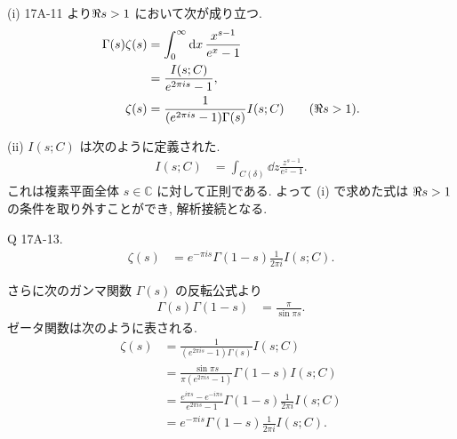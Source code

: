 \documentclass[uplatex,dvipdfmx,a4paper,11pt]{jlreq}
\theoremstyle{definition}
\newcommand{\CC}{\mathbb{C}}
\begin{document}
(i) 17A-11 より$\real s > 1$ において次が成り立つ.
\begin{align}
  \Gamma(s)\zeta(s) & = \int_0^\infty\dd{x}\frac{x^{s-1}}{e^x - 1}                        \\
                    & = \frac{I(s; C)}{e^{2\pi is} - 1},                                  \\
  \zeta(s)          & = \frac{1}{(e^{2\pi is} - 1)\Gamma(s)}I(s; C) \qquad (\real s > 1).
\end{align}

(ii)
$I(s; C)$ は次のように定義された.
\begin{align}
  I(s; C) & = \int_{C(\delta)}\dd{z}\frac{z^{s-1}}{e^z - 1}.
\end{align}
これは複素平面全体 $s\in\CC$ に対して正則である. よって (i) で求めた式は $\real s > 1$ の条件を取り外すことができ, 解析接続となる.

\begin{itembox}[l]{Q 17A-13.}
  \begin{align}
    \zeta(s) & = e^{-\pi is}\Gamma(1 - s)\frac{1}{2\pi i}I(s; C).
  \end{align}
\end{itembox}

さらに次のガンマ関数 $\Gamma(s)$ の反転公式より
\begin{align}
  \Gamma(s)\Gamma(1-s) & = \frac{\pi}{\sin\pi s}.
\end{align}
ゼータ関数は次のように表される.
\begin{align}
  \zeta(s) & = \frac{1}{(e^{2\pi is} - 1)\Gamma(s)}I(s; C)                                          \\
           & = \frac{\sin\pi s}{\pi(e^{2\pi is} - 1)}\Gamma(1 - s)I(s; C)                           \\
           & = \frac{e^{i\pi s} - e^{-i\pi s}}{e^{2\pi is} - 1}\Gamma(1 - s)\frac{1}{2\pi i}I(s; C) \\
           & = e^{-\pi is}\Gamma(1 - s)\frac{1}{2\pi i}I(s; C).
\end{align}
\end{document}
